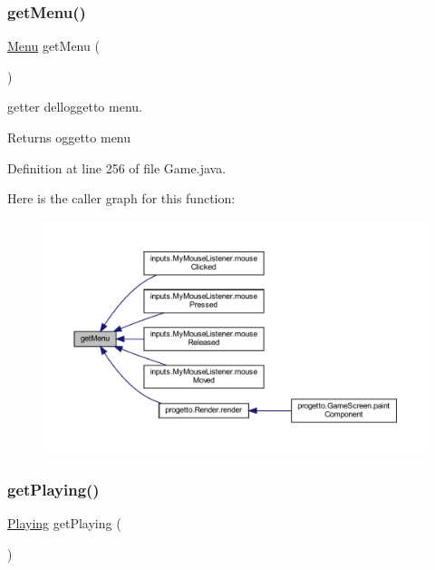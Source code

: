 \subsubsection{\texorpdfstring{get\+Menu()}{getMenu()}}
{\footnotesize\ttfamily \hyperlink{classscenes_1_1_menu}{Menu} get\+Menu (\begin{DoxyParamCaption}{ }\end{DoxyParamCaption})}



getter dell\textquotesingle{}oggetto menu. 

\begin{DoxyReturn}{Returns}
oggetto menu 
\end{DoxyReturn}


Definition at line 256 of file Game.\+java.

Here is the caller graph for this function\+:\nopagebreak
\begin{figure}[H]
\begin{center}
\leavevmode
\includegraphics[width=350pt]{classprogetto_1_1_game_a32527bf330947f1c1d1f5a7da9d12940_icgraph}
\end{center}
\end{figure}
\mbox{\label{classprogetto_1_1_game_a5ef843d72d0871e312ff734c6a129dd2}} 
\subsubsection{\texorpdfstring{get\+Playing()}{getPlaying()}}
{\footnotesize\ttfamily \hyperlink{classscenes_1_1_playing}{Playing} get\+Playing (\begin{DoxyParamCaption}{ }\end{DoxyParamCaption})}



